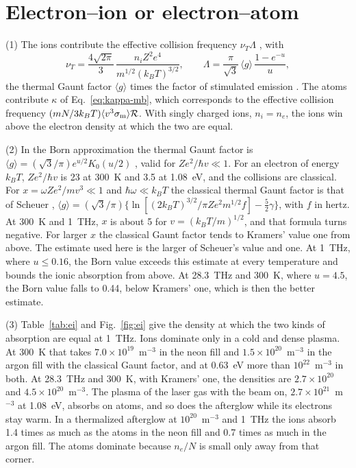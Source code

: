\documentclass[11pt]{article}
\numberwithin{equation}{section}
\newcommand{\kB}{k_B}
\newcommand{\sm}{\sigma_{\rm m}}
\begin{document}
\section{Electron--ion or electron--atom}
\label{sec:ei}

{\noindent}(1) The ions contribute the effective collision frequency
$\nu_T\Lambda$ \cite{Atzeni2004}, with
\[
\nu_T=\frac{4\sqrt{2\pi}}{3}\,\frac{n_iZ^2e^4}{m^{1/2}(\kB T)^{3/2}},\qquad
\Lambda=\frac{\pi}{\sqrt3}\,\langle g\rangle\,\frac{1-e^{-u}}{u},
\]
the thermal Gaunt factor $\langle g\rangle$ times the factor of stimulated emission
\cite{Kramers1923,KarzasLatter1961}. The atoms
contribute $\kappa$ of Eq.~\eqref{eq:kappa-mb}, which corresponds to the
effective collision frequency $(mN/3\kB T)\langle v^3\sm\rangle\mathcal R$.
With singly charged ions, $n_i=n_e$, the ions win above the electron density at
which the two are equal.

{\noindent}(2) In the Born approximation the thermal Gaunt factor is
$\langle g\rangle=(\sqrt3/\pi)e^{u/2}K_0(u/2)$ \cite{KarzasLatter1961}, valid for
$Ze^2/\hbar v\ll1$. For an electron of energy
$\kB T$, $Ze^2/\hbar v$ is 23 at 300~K and 3.5 at 1.08~eV, and the collisions
are classical. For $x=\omega Ze^2/mv^3\ll1$ and $\hbar\omega\ll\kB T$ the
classical thermal Gaunt factor is that of Scheuer \cite{Scheuer1960},
$\langle g\rangle=(\sqrt3/\pi)\{\ln[(2\kB T)^{3/2}/\pi Ze^2m^{1/2}f]-\frac52\gamma\}$,
with $f$ in hertz. At 300~K and 1~THz, $x$ is about 5 for $v=(\kB T/m)^{1/2}$,
and that formula turns negative. For larger $x$ the classical Gaunt factor
tends to Kramers' value one from above. The estimate used here is the larger
of Scheuer's value and one. At 1~THz, where $u\le0.16$, the Born value exceeds
this estimate at every temperature and bounds the ionic absorption from
above. At 28.3~THz and 300~K, where $u=4.5$, the Born value falls to 0.44,
below Kramers' one, which is then the better estimate.

{\noindent}(3) Table~\ref{tab:ei} and Fig.~\ref{fig:ei} give the density
at which the two kinds of absorption are equal at 1~THz. Ions dominate only in
a cold and dense plasma. At 300~K that takes $7.0\times10^{19}$~m$^{-3}$ in the
neon fill and $1.5\times10^{20}$~m$^{-3}$ in the argon fill with the classical
Gaunt factor, and at 0.63~eV more than $10^{22}$~m$^{-3}$ in both. At 28.3~THz
and 300~K, with Kramers' one, the densities are $2.7\times10^{20}$ and
$4.5\times10^{20}$~m$^{-3}$. The plasma of the laser gas with the beam on,
$2.7\times10^{21}$~m$^{-3}$ at 1.08~eV, absorbs on atoms, and so does the
afterglow while its electrons stay warm. In a thermalized afterglow at
$10^{20}$~m$^{-3}$ and 1~THz the ions absorb 1.4 times as much as the atoms in
the neon fill and 0.7 times as much in the argon fill. The atoms dominate
because $n_e/N$ is small only away from that corner.
\end{document}
